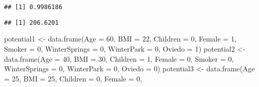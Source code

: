 \documentclass[
]{article}
\newenvironment{Shaded}{\begin{snugshade}}{\end{snugshade}}
\newcommand{\AttributeTok}[1]{\textcolor[rgb]{0.77,0.63,0.00}{#1}}
\newcommand{\DecValTok}[1]{\textcolor[rgb]{0.00,0.00,0.81}{#1}}
\newcommand{\FunctionTok}[1]{\textcolor[rgb]{0.00,0.00,0.00}{#1}}
\newcommand{\NormalTok}[1]{#1}
\newcommand{\OtherTok}[1]{\textcolor[rgb]{0.56,0.35,0.01}{#1}}
\newcommand{\SpecialCharTok}[1]{\textcolor[rgb]{0.00,0.00,0.00}{#1}}
\begin{document}
\begin{verbatim}
## [1] 0.9986186
\end{verbatim}

\begin{Shaded}
\end{Shaded}

\begin{verbatim}
## [1] 206.6201
\end{verbatim}

\begin{Shaded}
\begin{Highlighting}[]
\NormalTok{potential1 }\OtherTok{\textless{}{-}} \FunctionTok{data.frame}\NormalTok{(}\AttributeTok{Age =} \DecValTok{60}\NormalTok{,}
                            \AttributeTok{BMI =} \DecValTok{22}\NormalTok{,}
                            \AttributeTok{Children =} \DecValTok{0}\NormalTok{,}
                            \AttributeTok{Female =} \DecValTok{1}\NormalTok{,}
                            \AttributeTok{Smoker =} \DecValTok{0}\NormalTok{,}
                            \AttributeTok{WinterSprings =} \DecValTok{0}\NormalTok{,}
                            \AttributeTok{WinterPark =} \DecValTok{0}\NormalTok{,}
                            \AttributeTok{Oviedo =} \DecValTok{1}\NormalTok{)}
\NormalTok{potential2 }\OtherTok{\textless{}{-}} \FunctionTok{data.frame}\NormalTok{(}\AttributeTok{Age =} \DecValTok{40}\NormalTok{,}
                            \AttributeTok{BMI =} \DecValTok{30}\NormalTok{,}
                            \AttributeTok{Children =} \DecValTok{1}\NormalTok{,}
                            \AttributeTok{Female =} \DecValTok{0}\NormalTok{,}
                            \AttributeTok{Smoker =} \DecValTok{0}\NormalTok{,}
                            \AttributeTok{WinterSprings =} \DecValTok{0}\NormalTok{,}
                            \AttributeTok{WinterPark =} \DecValTok{0}\NormalTok{,}
                            \AttributeTok{Oviedo =} \DecValTok{0}\NormalTok{)}
\NormalTok{potential3 }\OtherTok{\textless{}{-}} \FunctionTok{data.frame}\NormalTok{(}\AttributeTok{Age =} \DecValTok{25}\NormalTok{,}
                            \AttributeTok{BMI =} \DecValTok{25}\NormalTok{,}
                            \AttributeTok{Children =} \DecValTok{0}\NormalTok{,}
                            \AttributeTok{Female =} \DecValTok{0}\NormalTok{,}

\end{Highlighting}
\end{Shaded}
\end{document}
